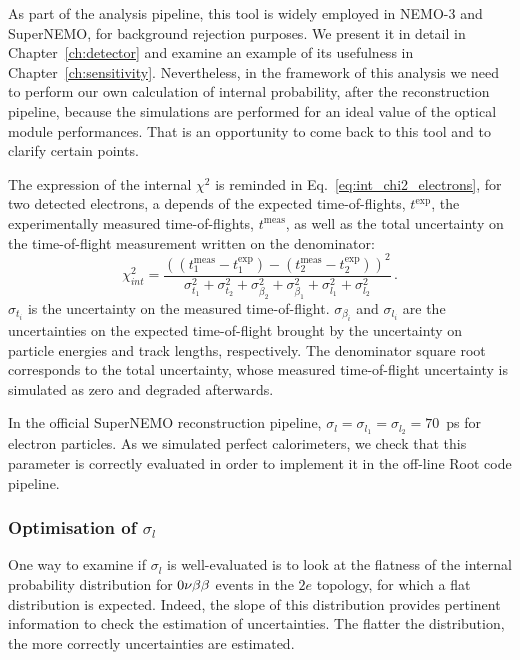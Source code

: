As part of the analysis pipeline, this tool is widely employed in NEMO-$3$ and SuperNEMO, for background rejection purposes.
We present it in detail in Chapter~\ref{ch:detector} and examine an example of its usefulness in Chapter~\ref{ch:sensitivity}.
Nevertheless, in the framework of this analysis we need to perform our own calculation of internal probability, after the reconstruction pipeline, because the simulations are performed for an ideal value of the optical module performances.
That is an opportunity to come back to this tool and to clarify certain points.

The expression of the internal $\chi^{2}$ is reminded in Eq.~\eqref{eq:int_chi2_electrons}, for two detected electrons, a depends of the expected time-of-flights, $t^{\text{exp}}$, the experimentally measured time-of-flights, $t^{\text{meas}}$, as well as the total uncertainty on the time-of-flight measurement written on the denominator:
\begin{equation}
  \chi^{2}_{int}=\frac{((t^{\text{meas}}_{1} - t^{\text{exp}}_{1}) - (t^{\text{meas}}_{2} - t^{\text{exp}}_{2}))^{2}}{\sigma_{t_{1}}^{2}+\sigma_{t_{2}}^{2}+\sigma_{\beta_{2}}^{2}+\sigma_{\beta_{1}}^{2}+\sigma_{l_{1}}^{2}+\sigma_{l_{2}}^{2}}\,.
  \label{eq:int_chi2_electrons}
\end{equation}
$\sigma_{t_{i}}$ is the uncertainty on the measured time-of-flight.
$\sigma_{\beta_{i}}$ and $\sigma_{l_{i}}$ are the uncertainties on the expected time-of-flight brought by the uncertainty on particle energies and track lengths, respectively.
The denominator square root corresponds to the total uncertainty, whose measured time-of-flight uncertainty is simulated as zero and degraded afterwards.

In the official SuperNEMO reconstruction pipeline, ${\sigma_{l}=\sigma_{l_{1}}=\sigma_{l_{2}}=70}$~ps for electron particles.
As we simulated perfect calorimeters, we check that this parameter is correctly evaluated in order to implement it in the off-line Root code pipeline.

\subsubsection*{Optimisation of $\sigma_{l}$}

One way to examine if $\sigma_{l}$ is well-evaluated is to look at the flatness of the internal probability distribution for $0\nu\beta\beta$ events in the $2e$ topology, for which a flat distribution is expected.
Indeed, the slope of this distribution provides pertinent information to check the estimation of uncertainties.
The flatter the distribution, the more correctly uncertainties are estimated.

